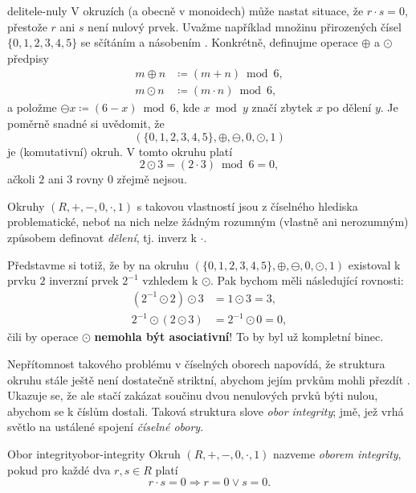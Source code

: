 \begin{warning}{}{delitele-nuly}
 V okruzích (a obecně v monoidech) může nastat situace, že $r \cdot s = 0$,
 přestože $r$ ani $s$ není nulový prvek. Uvažme například množinu přirozených
 čísel $\{0,1,2,3,4,5\}$ se sčítáním a násobením . Konkrétně,
 definujme operace $ \oplus $ a $\odot$ předpisy
 \begin{align*}
  m \oplus n &\coloneqq (m + n) \bmod 6,\\
  m \odot n & \coloneqq (m \cdot n) \bmod 6,
 \end{align*}
 a položme $\ominus x \coloneqq (6-x) \bmod 6$, kde $x \bmod y$ značí zbytek $x$
 po dělení $y$. Je poměrně snadné si uvědomit, že
 \[
  (\{0,1,2,3,4,5\}, \oplus ,\ominus, 0, \odot, 1)
 \]
 je (komutativní) okruh. V tomto okruhu platí
 \[
  2 \odot 3 = (2 \cdot 3) \bmod 6 = 0,
 \]
 ačkoli $2$ ani $3$ rovny $0$ zřejmě nejsou.

 Okruhy $(R,+,-,0, \cdot ,1)$  s takovou vlastností jsou z číselného hlediska
 problematické, neboť na nich nelze žádným rozumným (vlastně ani nerozumným)
 způsobem definovat \emph{dělení}, tj. inverz k $\cdot$.

 Představme si totiž, že by na okruhu $(\{0,1,2,3,4,5\}, \oplus ,\ominus, 0,
 \odot, 1)$ existoval k prvku $2$ inverzní prvek $2^{-1}$ vzhledem k $\odot$.
 Pak bychom měli následující rovnosti:
 \begin{align*}
  (2^{-1} \odot 2) \odot 3 &= 1 \odot 3 = 3,\\
  2^{-1} \odot (2 \odot 3) &= 2^{-1} \odot 0 = 0,
 \end{align*}
 čili by operace $\odot$ \textbf{nemohla být asociativní}! To by byl už
 kompletní binec.
\end{warning}

Nepřítomnost takového problému v číselných oborech napovídá, že struktura okruhu
stále ještě není dostatečně striktní, abychom jejím prvkům mohli přezdít
. Ukazuje se, že ale stačí zakázat součinu dvou nenulových prvků býti
nulou, abychom se k číslům dostali. Taková struktura slove \emph{obor
integrity}; jmě, jež vrhá světlo na ustálené spojení \emph{číselné obory}.

\begin{definition}{Obor integrity}{obor-integrity}
 Okruh $(R,+,-,0, \cdot ,1)$ nazveme \emph{oborem integrity}, pokud pro každé
 dva $r,s \in R$ platí
 \[
  r \cdot s = 0 \Rightarrow r = 0 \vee s = 0.
 \]
\end{definition}

